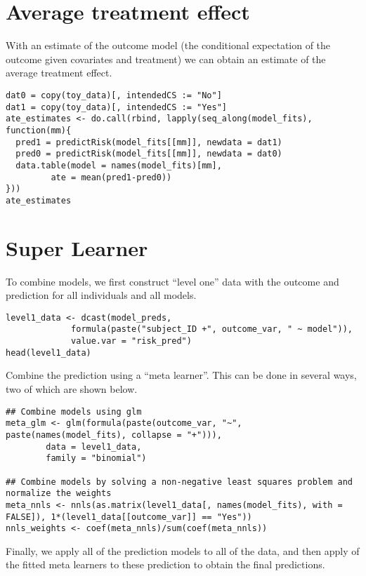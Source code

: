 \documentclass[a4paper,danish]{article}
\begin{document}
\section{Average treatment effect}
\label{sec:org7c17a2a}
With an estimate of the outcome model (the conditional expectation of the outcome given covariates
and treatment) we can obtain an estimate of the average treatment effect.

\lstset{language=r,label= ,caption= ,captionpos=b,numbers=none}
\begin{lstlisting}
dat0 = copy(toy_data)[, intendedCS := "No"]
dat1 = copy(toy_data)[, intendedCS := "Yes"]
ate_estimates <- do.call(rbind, lapply(seq_along(model_fits), function(mm){
  pred1 = predictRisk(model_fits[[mm]], newdata = dat1)
  pred0 = predictRisk(model_fits[[mm]], newdata = dat0)
  data.table(model = names(model_fits)[mm],
	     ate = mean(pred1-pred0))
}))
ate_estimates
\end{lstlisting}

\section{Super Learner}
\label{sec:orgc89907b}
To combine models, we first construct ``level one'' data with the outcome and prediction for all
individuals and all models.

\lstset{language=r,label= ,caption= ,captionpos=b,numbers=none}
\begin{lstlisting}
level1_data <- dcast(model_preds,
		     formula(paste("subject_ID +", outcome_var, " ~ model")),
		     value.var = "risk_pred")
head(level1_data)
\end{lstlisting}

Combine the prediction using a ``meta learner''. This can be done in several ways, two of which are
shown below.
\lstset{language=r,label= ,caption= ,captionpos=b,numbers=none}
\begin{lstlisting}
## Combine models using glm
meta_glm <- glm(formula(paste(outcome_var, "~", paste(names(model_fits), collapse = "+"))),
		data = level1_data,
		family = "binomial")

## Combine models by solving a non-negative least squares problem and normalize the weights
meta_nnls <- nnls(as.matrix(level1_data[, names(model_fits), with = FALSE]), 1*(level1_data[[outcome_var]] == "Yes"))
nnls_weights <- coef(meta_nnls)/sum(coef(meta_nnls))
\end{lstlisting}

Finally, we apply all of the prediction models to all of the data, and then apply of the fitted meta
learners to these prediction to obtain the final predictions.
\end{document}
